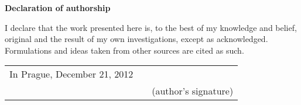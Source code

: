 \newcommand{\odsaditodzhora}{\hskip1pt\vfill}

\odsaditodzhora
\noindent \textbf{Declaration of authorship}


I declare that the work presented here is, to the best of my knowledge and belief,
original and the result of my own investigations, except as acknowledged.
Formulations and ideas taken from other sources are cited as such.

\begin{flushleft}
\begin{tabular}{cp{}c}
In Prague, December 21, 2012
&
&
\underline{\hspace{4cm}}
\\
&&
(author's signature)
\end{tabular}

\end{flushleft}

